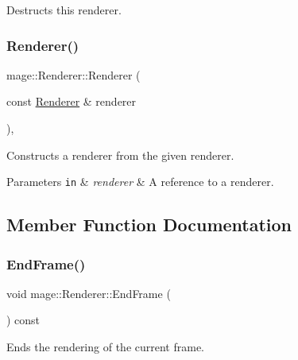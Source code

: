 Destructs this renderer. \hypertarget{classmage_1_1_renderer_acd6b509da2bd7e7d764b45b912fe5298}{}\label{classmage_1_1_renderer_acd6b509da2bd7e7d764b45b912fe5298} 
\subsubsection{\texorpdfstring{Renderer()}{Renderer()}\hspace{0.1cm}{\footnotesize\ttfamily [2/2]}}
{\footnotesize\ttfamily mage\+::\+Renderer\+::\+Renderer (\begin{DoxyParamCaption}\item[{const \hyperlink{classmage_1_1_renderer}{Renderer} \&}]{renderer }\end{DoxyParamCaption})\hspace{0.3cm}{\ttfamily [private]}, {\ttfamily [delete]}}

Constructs a renderer from the given renderer.


\begin{DoxyParams}[1]{Parameters}
\mbox{\tt in}  & {\em renderer} & A reference to a renderer. \\
\hline
\end{DoxyParams}


\subsection{Member Function Documentation}
\hypertarget{classmage_1_1_renderer_a4932c51d0f6e56269712024d2d0322ef}{}\label{classmage_1_1_renderer_a4932c51d0f6e56269712024d2d0322ef} 
\subsubsection{\texorpdfstring{End\+Frame()}{EndFrame()}}
{\footnotesize\ttfamily void mage\+::\+Renderer\+::\+End\+Frame (\begin{DoxyParamCaption}{ }\end{DoxyParamCaption}) const}

Ends the rendering of the current frame. \hypertarget{classmage_1_1_renderer_a9465ff1640cb5333ca4e701977ae51ec}{}\label{classmage_1_1_renderer_a9465ff1640cb5333ca4e701977ae51ec} 
